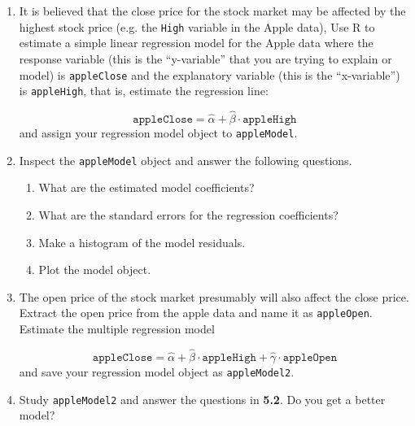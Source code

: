 \documentclass[a4paper]{article}
\begin{document}
\section{}
\begin{enumerate}
\item It is believed that the close price for the stock market may be affected
  by the highest stock price (e.g. the \texttt{High} variable in the Apple data),
  Use R to estimate a simple linear regression model for the Apple data where the response
  variable (this is the ``y-variable'' that you are trying to explain or model) is
  \texttt{appleClose} and the explanatory variable (this is the ``x-variable'') is \texttt{appleHigh}, that is,
  estimate the regression line:

  \begin{equation*}
    \mathtt{appleClose} = \hat \alpha + \hat \beta \cdot \mathtt{appleHigh} 
  \end{equation*}
  and assign your regression model object to \texttt{appleModel}.

\item Inspect the \texttt{appleModel} object and answer the following questions.
  \begin{enumerate}
  \item What are the estimated model coefficients?
    
  \item What are the standard errors for the regression coefficients?
 
  \item Make a histogram of the model residuals.

  \item Plot the model object.

  \end{enumerate}

\item The open price of the stock market presumably will also affect the
  close price. Extract the open price from the apple data and name it as
  \texttt{appleOpen}. Estimate the multiple regression model 
 
  \begin{equation*}
    \mathtt{appleClose} = \hat \alpha + \hat \beta \cdot \mathtt{appleHigh} +
    \hat \gamma \cdot \mathtt{appleOpen} 
  \end{equation*}
  and save your regression model object as \texttt{appleModel2}.

 \item Study \texttt{appleModel2} and answer the questions in \textbf{5.2}. Do
   you get a better model?


\end{enumerate}
\end{document}
